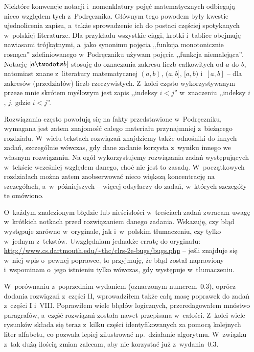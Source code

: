Niektóre konwencje notacji i~nomenklatury pojęć matematycznych odbiegają nieco względem tych z~Podręcznika.
Głównym tego powodem były kwestie ujednolicenia zapisu, a~także sprowadzenie ich do postaci częściej spotykanych w~polskiej literaturze.
Dla przykładu wszystkie ciągi, krotki i~tablice obejmuję nawiasami trójkątnymi, a~jako synonimu pojęcia ,,funkcja monotonicznie rosnąca'' zdefiniowanego w~Podręczniku używam pojęcia ,,funkcja niemalejąca''.
Notację $[a\twodots b]$ stosuję do oznaczania zakresu liczb całkowitych od $a$ do $b$, natomiast znane z~literatury matematycznej $(a,b)$, $(a,b]$, $[a,b)$ i~$[a,b]$ -- dla zakresów (przedziałów) liczb rzeczywistych.
Z~kolei często wykorzystywanym przeze mnie skrótem myślowym jest zapis ,,indeksy $i<j$'' w~znaczeniu ,,indeksy $i$, $j$, gdzie $i<j$''.

Rozwiązania często powołują się na fakty przedstawione w~Podręczniku, wymagana jest zatem znajomość całego materiału przynajmniej z~bieżącego rozdziału.
W~wielu tekstach rozwiązań znajdziemy także odnośniki do innych zadań, szczególnie wówczas, gdy dane zadanie korzysta z~wyniku innego we własnym rozwiązaniu.
Na ogół wykorzystujemy rozwiązania zadań występujących w~tekście wcześniej względem danego, choć nie jest to zasadą.
W~początkowych rozdziałach można zatem zaobserwować nieco większą koncentrację na szczegółach, a~w~późniejszych -- więcej odsyłaczy do zadań, w~których szczegóły te omówiono.

O~każdym znalezionym błędzie lub nieścisłości w~treściach zadań zwracam uwagę w~krótkich notkach przed rozwiązaniem danego zadania.
Wskazuję, czy błąd występuje zarówno w~oryginale, jak i~w~polskim tłumaczeniu, czy tylko w~jednym z~tekstów.
Uwzględniam jednakże erratę do oryginału: \url{http://www.cs.dartmouth.edu/~thc/clrs-2e-bugs/bugs.php} -- jeśli znajduje się w~niej wpis o~pewnej poprawce, to przyjmuję, że błąd został naprawiony i~wspominam o~jego istnieniu tylko wówczas, gdy występuje w~tłumaczeniu.

W~porównaniu z~poprzednim wydaniem (oznaczonym numerem~0.3), oprócz dodania rozwiązań z~części II, wprowadziłem także całą masę poprawek do zadań z~części I i~VIII.
Poprawiłem wiele błędów logicznych, przeredagowałem mnóstwo paragrafów, a~część rozwiązań została nawet przepisana w~całości.
Z~kolei wiele rysunków składa się teraz z~kilku części identyfikowanych za pomocą kolejnych liter alfabetu, co pozwala lepiej zilustrować np.\ działanie algorytmu.
W~związku z~tak dużą ilością zmian zalecam, aby nie korzystać już z~wydania~0.3.

